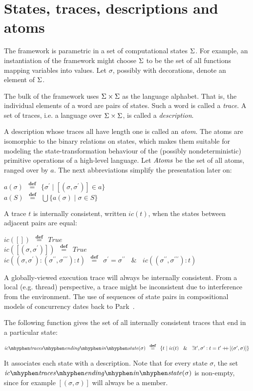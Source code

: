 \documentclass[a4paper,leqno]{llncs}
\newcommand{\mybox}[1]{\ensuremath{\text{\mbox{\ensuremath{#1}}}}}
\newcommand{\spacedwith}[2]{\ensuremath{\phantom{#2}#1\phantom{#2}}}
\newcommand{\spaced}[1]{\spacedwith{#1}{m}}
\newcommand{\primed}[1]{\ensuremath{#1^{\prime}}}
\newcommand{\dprimed}[1]{\ensuremath{#1^{\prime\prime}}}
\newcommand{\defn}{\spacedwith{\stackrel{\mathbf{def}}{=}}{o}}
\newcommand{\alub}{\ensuremath{\bigcup}}
\newcommand{\Atoms}{\mybox{\mathit{Atoms}}}
\newcommand{\States}{\mybox{\Sigma}}
\newcommand{\s}{\ensuremath{\sigma}}
\newcommand{\sprime}{\primed{\sigma}}
\newcommand{\sdprime}{\dprimed{\s}}
\newcommand{\stprime}{\ensuremath{\s^{\prime\prime\prime}}}
\newcommand{\trace}{\ensuremath{t}}
\newcommand{\tprime}{\primed{t}}
\newcommand{\ic}[1]{\ensuremath{\mathit{ic}(#1)}}
\newcommand{\icTracesEndingInState}[1]{\ensuremath{\mathit{ic\mhyphen traces\mhyphen ending\mhyphen in\mhyphen state}(#1)}}
\newcommand{\sand}{\spaced{\&}}
\newcommand{\append}[2]{\ensuremath{{#1}+\!\!\!+\,{#2}}}
\newcommand{\BEGINMYDEF}{\begin{trivlist}\item}
\newcommand{\ENDMYDEF}{\end{trivlist}}
\begin{document}
\section{States, traces, descriptions and atoms}\label{StatesTraces}
The framework is parametric in a set of computational states \States. For example, an instantiation of the framework might choose \States{} to be the set of all functions mapping variables into values. Let \s{}, possibly with decorations, denote an element of \States.

The bulk of the framework uses $\States \times \States$ as the language alphabet. That is, the individual elements of a word are pairs of states. Such a word is called a \emph{trace}. A set of traces, i.e. a language over $\States \times \States$, is called a \emph{description}.

A description whose traces all have length one is called an \emph{atom}.  The atoms are isomorphic to the binary relations on states, which makes them suitable for modeling the state-transformation behaviour of the (possibly nondeterministic) primitive operations of a high-level language. Let \Atoms{} be the set of all atoms, ranged over by $a$. The next abbreviations simplify the presentation later on:
\BEGINMYDEF
$a(\s) \defn \{\sprime \mid [(\s,\sprime)] \in a\}$ \\
$a(S) \defn \alub \{a(\s) \mid \s \in S\}$
\ENDMYDEF
\indent A trace \trace{} is internally consistent, written \ic{\trace}, when the states between adjacent pairs are equal:
\BEGINMYDEF
$\ic{[]} \defn True$ \\
$\ic{[(\s, \sprime)]} \defn True$ \\
$\ic{(\s, \sprime) : (\sdprime, \stprime) : \trace}   \defn   \sprime = \sdprime \sand \ic{(\sdprime, \stprime) : \trace}$
\ENDMYDEF
A globally-viewed execution trace will always be internally consistent. From a local (e.g. thread) perspective, a trace might be inconsistent due to interference from the environment. The use of sequences of state pairs in compositional models of concurrency dates back to Park~\cite{park80on}.

The following function gives the set of all internally consistent traces that end in a particular state:
\BEGINMYDEF
$\icTracesEndingInState{\s}  \defn   \{\trace \mid \ic{\trace}   \sand  \exists \tprime, \sprime : \trace = \append{\tprime}{[(\sprime, \s)]}\}$
\ENDMYDEF
It associates each state with a description. Note that for every state \s, the set \icTracesEndingInState{\s} is non-empty, since for example $[(\s,\s)]$ will always be a member.
\end{document}
